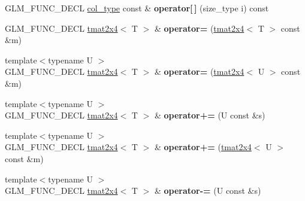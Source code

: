 \begin{DoxyCompactItemize}
\item 
\hypertarget{structglm_1_1detail_1_1tmat2x4_ad5c0e482eaa56f65ba4faa69d142d15e}{G\-L\-M\-\_\-\-F\-U\-N\-C\-\_\-\-D\-E\-C\-L \hyperlink{structglm_1_1detail_1_1tvec4}{col\-\_\-type} const \& {\bfseries operator\mbox{[}$\,$\mbox{]}} (size\-\_\-type i) const }\label{structglm_1_1detail_1_1tmat2x4_ad5c0e482eaa56f65ba4faa69d142d15e}

\item 
\hypertarget{structglm_1_1detail_1_1tmat2x4_a23f1bed296125c57dca1f5fe1f4b87a1}{G\-L\-M\-\_\-\-F\-U\-N\-C\-\_\-\-D\-E\-C\-L \hyperlink{structglm_1_1detail_1_1tmat2x4}{tmat2x4}$<$ T $>$ \& {\bfseries operator=} (\hyperlink{structglm_1_1detail_1_1tmat2x4}{tmat2x4}$<$ T $>$ const \&m)}\label{structglm_1_1detail_1_1tmat2x4_a23f1bed296125c57dca1f5fe1f4b87a1}

\item 
\hypertarget{structglm_1_1detail_1_1tmat2x4_aec127be8dd6961954be4e288c6284850}{{\footnotesize template$<$typename U $>$ }\\G\-L\-M\-\_\-\-F\-U\-N\-C\-\_\-\-D\-E\-C\-L \hyperlink{structglm_1_1detail_1_1tmat2x4}{tmat2x4}$<$ T $>$ \& {\bfseries operator=} (\hyperlink{structglm_1_1detail_1_1tmat2x4}{tmat2x4}$<$ U $>$ const \&m)}\label{structglm_1_1detail_1_1tmat2x4_aec127be8dd6961954be4e288c6284850}

\item 
\hypertarget{structglm_1_1detail_1_1tmat2x4_a0e73b6f6a88eae5236bd38cd153cdec3}{{\footnotesize template$<$typename U $>$ }\\G\-L\-M\-\_\-\-F\-U\-N\-C\-\_\-\-D\-E\-C\-L \hyperlink{structglm_1_1detail_1_1tmat2x4}{tmat2x4}$<$ T $>$ \& {\bfseries operator+=} (U const \&s)}\label{structglm_1_1detail_1_1tmat2x4_a0e73b6f6a88eae5236bd38cd153cdec3}

\item 
\hypertarget{structglm_1_1detail_1_1tmat2x4_abb0f4bd0dfd03f0bc7f30961a9f17c21}{{\footnotesize template$<$typename U $>$ }\\G\-L\-M\-\_\-\-F\-U\-N\-C\-\_\-\-D\-E\-C\-L \hyperlink{structglm_1_1detail_1_1tmat2x4}{tmat2x4}$<$ T $>$ \& {\bfseries operator+=} (\hyperlink{structglm_1_1detail_1_1tmat2x4}{tmat2x4}$<$ U $>$ const \&m)}\label{structglm_1_1detail_1_1tmat2x4_abb0f4bd0dfd03f0bc7f30961a9f17c21}

\item 
\hypertarget{structglm_1_1detail_1_1tmat2x4_abd54d0c6d5f17a59255bfed83f764bea}{{\footnotesize template$<$typename U $>$ }\\G\-L\-M\-\_\-\-F\-U\-N\-C\-\_\-\-D\-E\-C\-L \hyperlink{structglm_1_1detail_1_1tmat2x4}{tmat2x4}$<$ T $>$ \& {\bfseries operator-\/=} (U const \&s)}\label{structglm_1_1detail_1_1tmat2x4_abd54d0c6d5f17a59255bfed83f764bea}


\end{DoxyCompactItemize}
